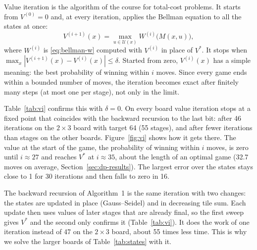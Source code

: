 \documentclass[11pt,a4paper]{article}
\theoremstyle{remark}
\newcommand{\U}{\mathcal{U}}
\begin{document}
Value iteration is the algorithm of the course for total-cost problems. It starts from $V^{(0)}=0$ and, at every iteration, applies the Bellman equation to all the states at once:
\[
V^{(i+1)}(x)=\max_{u\in\U(x)} W^{(i)}\bigl(M(x,u)\bigr),
\]
where $W^{(i)}$ is \eqref{eq:bellman-w} computed with $V^{(i)}$ in place of $V^*$. It stops when $\max_x|V^{(i+1)}(x)-V^{(i)}(x)|\le\delta$. Started from zero, $V^{(i)}(x)$ has a simple meaning: the best probability of winning within $i$ moves. Since every game ends within a bounded number of moves, the iteration becomes exact after finitely many steps (at most one per stage), not only in the limit.

Table~\ref{tab:vi} confirms this with $\delta=0$. On every board value iteration stops at a fixed point that coincides with the backward recursion to the last bit: after 46 iterations on the $2\times3$ board with target 64 (55 stages), and after fewer iterations than stages on the other boards. Figure~\ref{fig:vi} shows how it gets there. The value at the start of the game, the probability of winning within $i$ moves, is zero until $i\approx27$ and reaches $V^*$ at $i\approx35$, about the length of an optimal game (32.7 moves on average, Section~\ref{sec:dp-results}). The largest error over the states stays close to 1 for 30 iterations and then falls to zero in 16.

The backward recursion of Algorithm~1 is the same iteration with two changes: the states are updated in place (Gauss--Seidel) and in decreasing tile sum. Each update then uses values of later stages that are already final, so the first sweep gives $V^*$ and the second only confirms it (Table~\ref{tab:vi}). It does the work of one iteration instead of 47 on the $2\times3$ board, about 55 times less time. This is why we solve the larger boards of Table~\ref{tab:states} with it.
\end{document}
